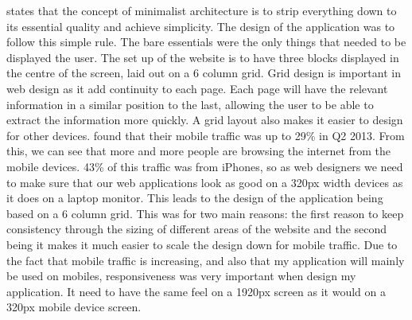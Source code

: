 \citet{bertoni:2002} states that the concept of minimalist architecture is to strip everything down to its essential quality and achieve simplicity. The design of the application was to follow this simple rule. The bare essentials were the only things that needed to be displayed the user. The set up of the website is to have three blocks displayed in the centre of the screen, laid out on a 6 column grid. Grid design is important in web design as it add continuity to each page. Each page will have the relevant information in a similar position to the last, allowing the user to be able to extract the information more quickly. A grid layout also makes it easier to design for other devices. \citet{walkers:2013} found that their mobile traffic was up to 29\% in Q2 2013. From this, we can see that more and more people are browsing the internet from the mobile devices. 43\% of this traffic was from iPhones, so as web designers we need to make sure that our web applications look as good on a 320px width devices as it does on a laptop monitor. This leads to the design of the application being based on a 6 column grid. This was for two main reasons: the first reason to keep consistency through the sizing of different areas of the website and the second being it makes it much easier to scale the design down for mobile traffic. Due to the fact that mobile traffic is increasing, and also that my application will mainly be used on mobiles, responsiveness was very important when design my application. It need to have the same feel on a 1920px screen as it would on a 320px mobile device screen.\\

